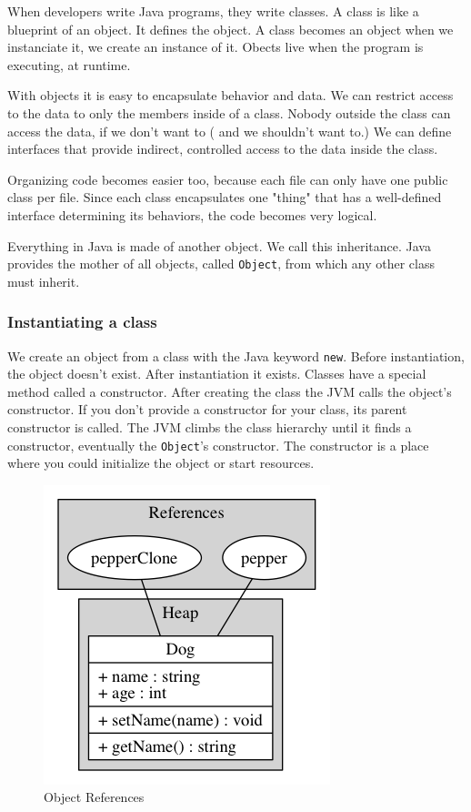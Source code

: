 When developers write Java programs, they write classes. A class is like a blueprint of an object. It defines the object. A class becomes an object when we instanciate it, we create an instance of it. Obects live when the program is executing, at runtime.

With objects it is easy to encapsulate behavior and data. We can restrict access to the data to only the members inside of a class. Nobody outside the class can access the data, if we don't want to ( and we shouldn't want to.) We can define interfaces that provide indirect, controlled access to the data inside the class.

Organizing code becomes easier too, because each file can only have one  public class per file. Since each class encapsulates one "thing" that has a well-defined interface determining its behaviors, the code becomes very logical.

Everything in Java is made of another object. We call this inheritance. Java provides the mother of all objects, called \texttt{Object}, from which any other class must inherit.

\subsubsection{Instantiating a class}
We create an object from a class with the Java keyword \texttt{new}. Before instantiation, the object doesn't exist. After instantiation it exists. Classes have a special method called a constructor. After creating the class the JVM calls the object's constructor. If you don't provide a constructor for your class, its parent constructor is called. The JVM climbs the class hierarchy until it finds  a constructor, eventually the \texttt{Object}'s constructor. The constructor is a place where you could initialize the object or start resources.\cite{nicholas}
\begin{figure}[H]\centering %
\includegraphics[width=0.5\linewidth, frame]{object-reference}
\caption{Object References}
\label{fig:object-references}
\end{figure}
